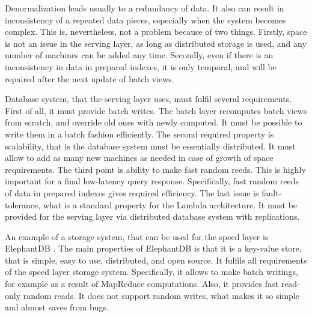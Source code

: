 Denormalization leads usually to a redundancy of data.
It also can result in inconsistency of a repeated data pieces, especially when the system becomes complex.
This is, nevertheless, not a problem because of two things.
Firstly, space is not an issue in the serving layer, as long as distributed storage is used, and any number of machines can be added any time.
Secondly, even if there is an inconsistency in data in prepared indexes, it is only temporal, and will be repaired after the next update of batch views.

Database system, that the serving layer uses, must fulfil several requirements.
First of all, it must provide batch writes.
The batch layer recomputes batch views from scratch, and override old ones with newly computed.
It must be possible to write them in a batch fashion efficiently.
The second required property is scalability, that is the database system must be essentially distributed.
It must allow to add as many new machines as needed in case of growth of space requirements.
The third point is ability to make fast random reeds.
This is highly important for a final low-latency query response.
Specifically, fast random reeds of data in prepared indexes gives required efficiency.
The last issue is fault-tolerance, what is a standard property for the Lambda architecture.
It must be provided for the serving layer via distributed database system with replications.

An example of a storage system, that can be used for the speed layer is ElephantDB \cite{ElephantDB, Macbeth2013}.
The main properties of ElephantDB is that it is a key-value store, that is simple, easy to use, distributed, and open source.
It fulfils all requirements of the speed layer storage system.
Specifically, it allows to make batch writings, for example as a result of MapReduce computations.
Also, it provides fast read-only random reads.
It does not support random writes, what makes it so simple and almost saves from bugs.